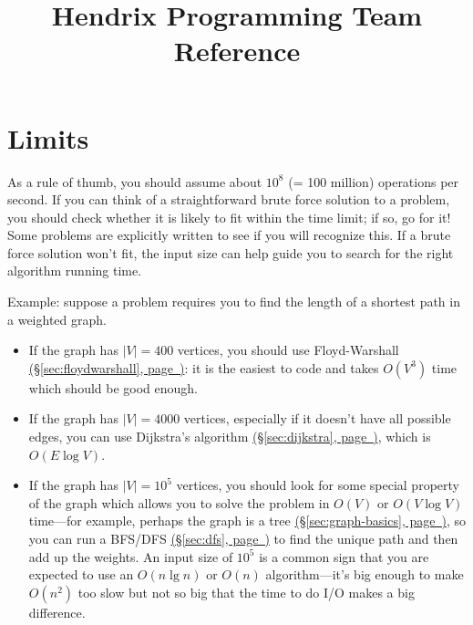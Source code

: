 \documentclass[10pt]{book}
\newcommand*{\link}[1]{\hyperref[{#1}]{(\S\ref*{#1}, page~\pageref*{#1})}}
\begin{document}
\title{Hendrix Programming Team Reference}
\maketitle

\tableofcontents
\newpage

\chapter{Limits}

As a rule of thumb, you should assume about $10^8$ (= 100 million)
operations per second.  If you can think of a straightforward brute
force solution to a problem, you should check whether it is likely to
fit within the time limit; if so, go for it!  Some problems are
explicitly written to see if you will recognize this.  If a brute
force solution won't fit, the input size can help guide you to search
for the right algorithm running time.

Example: suppose a problem requires you to find the length of a
shortest path in a weighted graph.
\begin{itemize}
\item If the graph has $|V| = 400$ vertices, you should use
  Floyd-Warshall \link{sec:floydwarshall}: it is the easiest to code and takes $O(V^3)$ time
  which should be good enough.
\item If the graph has $|V| = 4000$ vertices, especially if it doesn't
  have all possible edges, you can use Dijkstra's algorithm
  \link{sec:dijkstra}, which is $O(E \log V)$.
\item If the graph has $|V| = 10^5$ vertices, you should look for some
  special property of the graph which allows you to solve the problem
  in $O(V)$ or $O(V \log V)$ time---for example, perhaps the graph is
  a tree \link{sec:graph-basics}, so you can run a BFS/DFS \link{sec:dfs}
  to find the unique path and then add up the weights.  An input size of
  $10^5$ is a common sign that you are expected to use an $O(n \lg n)$
  or $O(n)$ algorithm---it's big enough to make $O(n^2)$ too slow but
  not so big that the time to do I/O makes a big difference.
\end{itemize}
\end{document}
